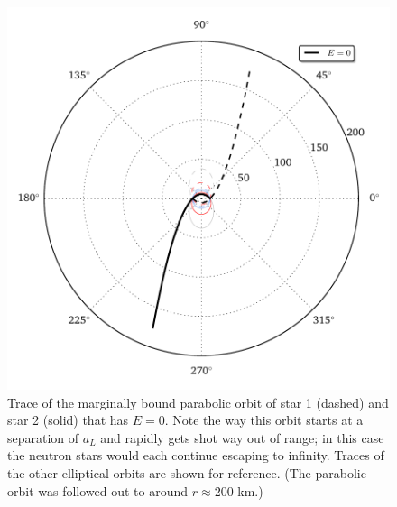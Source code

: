 \documentclass[11pt]{article}
\begin{document}
\begin{figure}[!h]
\centering
\includegraphics[scale=1]{stable_orbit/orbit_diagram_unbound.pdf}
\caption{\label{fig:trace_unbound} Trace of the marginally bound parabolic orbit of star 1 (dashed) and star 2 (solid) that has $E=0$. Note the way this orbit starts at a separation of $a_L$ and rapidly gets shot way out of range; in this case the neutron stars would each continue escaping to infinity. Traces of the other elliptical orbits are shown for reference. (The parabolic orbit was followed out to around $r\approx 200$ km.)}
\end{figure}
\end{document}
